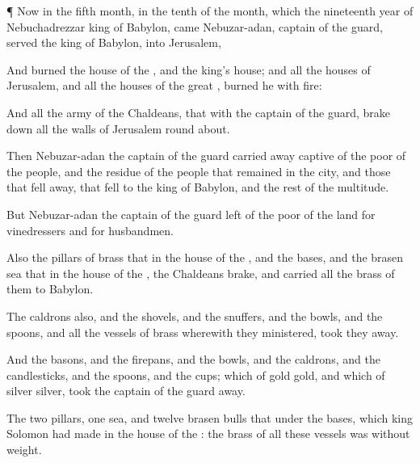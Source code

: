 {\par }{\PP {}¶ Now in the
fifth
month, in the
tenth
{} of the
month, which
{} the
nineteenth
year of
Nebuchadrezzar
king of
Babylon,
came
Nebuzar-adan,
captain of the
guard,
{}
served the
king of
Babylon, into
Jerusalem,

And
burned the
house of the
{}, and the
king’s
house; and all the
houses of
Jerusalem, and all the
houses of the
great
{},
burned he with
fire:

And all the
army of the
Chaldeans, that
{} with the
captain of the
guard, brake
down all the
walls of
Jerusalem round
about.

Then
Nebuzar-adan the
captain of the
guard carried away
captive
{} of the
poor of the
people, and the
residue of the
people that
remained in the
city, and those that fell
away, that
fell to the
king of
Babylon, and the
rest of the
multitude.

But
Nebuzar-adan the
captain of the
guard
left
{} of the
poor of the
land for
vinedressers and for
husbandmen.

Also the
pillars of
brass that
{} in the
house of the
{}, and the
bases, and the
brasen
sea that
{} in the
house of the
{}, the
Chaldeans
brake, and
carried all the
brass of them to
Babylon.

The
caldrons also, and the
shovels, and the
snuffers, and the
bowls, and the
spoons, and all the
vessels of
brass wherewith they
ministered, took they
away.

And the
basons, and the
firepans, and the
bowls, and the
caldrons, and the
candlesticks, and the
spoons, and the
cups;
{} which
{} of
gold
{}
gold, and
{} which
{} of
silver
{}
silver,
took the
captain of the
guard
away.

The
two
pillars,
one
sea, and
twelve
brasen
bulls that
{} under the
bases, which
king
Solomon had
made in the
house of the
{}: the
brass of all these
vessels was without
weight.

}
